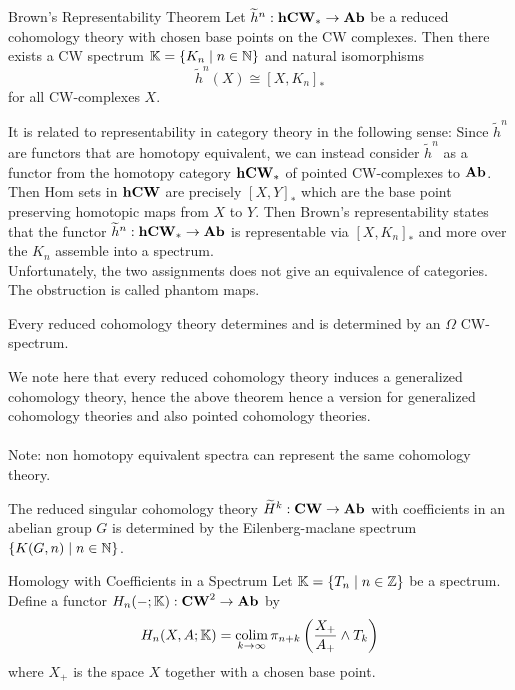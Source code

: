 \documentclass[a4paper]{article}
\begin{document}
\begin{thm}{Brown's Representability Theorem}{} Let $\widetilde{h}^n:\bold{hCW}_\ast\to\bold{Ab}$ be a reduced cohomology theory with chosen base points on the CW complexes. Then there exists a CW spectrum $\mathbb{K}=\{K_n\;|\;n\in\mathbb{N}\}$ and natural isomorphisms $$\widetilde{h}^n(X)\cong[X,K_n]_\ast$$ for all CW-complexes $X$. 
\end{thm}

It is related to representability in category theory in the following sense: Since $\widetilde{h}^n$ are functors that are homotopy equivalent, we can instead consider $\widetilde{h}^n$ as a functor from the homotopy category $\bold{hCW}_\ast$ of pointed CW-complexes to $\bold{Ab}$. Then Hom sets in $\bold{hCW}$ are precisely $[X,Y]_\ast$ which are the base point preserving homotopic maps from $X$ to $Y$. Then Brown's representability states that the functor $\widetilde{h}^n:\bold{hCW}_\ast\to\bold{Ab}$ is representable via $[X,K_n]_\ast$ and more over the $K_n$ assemble into a spectrum. \\

Unfortunately, the two assignments does not give an equivalence of categories. The obstruction is called phantom maps. 

\begin{thm}{}{} Every reduced cohomology theory determines and is determined by an $\Omega$ CW-spectrum. 
\end{thm}

We note here that every reduced cohomology theory induces a generalized cohomology theory, hence the above theorem hence a version for generalized cohomology theories and also pointed cohomology theories. \\~\\

Note: non homotopy equivalent spectra can represent the same cohomology theory. 

\begin{thm}{}{} The reduced singular cohomology theory $\widetilde{H}^k:\bold{CW}\to\bold{Ab}$ with coefficients in an abelian group $G$ is determined by the Eilenberg-maclane spectrum $\{K(G,n)\;|\;n\in\mathbb{N}\}$. 
\end{thm}

\begin{defn}{Homology with Coefficients in a Spectrum}{} Let $\mathbb{K}=\{T_n\;|\;n\in\mathbb{Z}\}$ be a spectrum. Define a functor $H_n(-;\mathbb{K}):\bold{CW}^2\to\bold{Ab}$ by $$H_n(X,A;\mathbb{K})=\operatorname*{colim}_{k\to\infty}\pi_{n+k}\left(\frac{X_+}{A_+}\wedge T_k\right)$$ where $X_+$ is the space $X$ together with a chosen base point. 
\end{defn}
\end{document}
